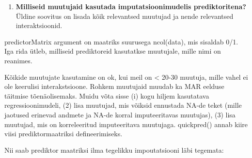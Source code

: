 \documentclass[]{book}
\newenvironment{Shaded}{\begin{snugshade}}{\end{snugshade}}
\newcommand{\KeywordTok}[1]{\textcolor[rgb]{0.13,0.29,0.53}{\textbf{#1}}}
\newcommand{\DataTypeTok}[1]{\textcolor[rgb]{0.13,0.29,0.53}{#1}}
\newcommand{\DecValTok}[1]{\textcolor[rgb]{0.00,0.00,0.81}{#1}}
\newcommand{\StringTok}[1]{\textcolor[rgb]{0.31,0.60,0.02}{#1}}
\newcommand{\CommentTok}[1]{\textcolor[rgb]{0.56,0.35,0.01}{\textit{#1}}}
\newcommand{\OtherTok}[1]{\textcolor[rgb]{0.56,0.35,0.01}{#1}}
\newcommand{\OperatorTok}[1]{\textcolor[rgb]{0.81,0.36,0.00}{\textbf{#1}}}
\newcommand{\NormalTok}[1]{#1}
\providecommand{\tightlist}{%
  \setlength{\itemsep}{0pt}\setlength{\parskip}{0pt}}
\begin{document}
\begin{enumerate}
\def\labelenumi{\arabic{enumi}.}
\setcounter{enumi}{2}
\tightlist
\item
  \textbf{Milliseid muutujaid kasutada imputatsioonimudelis
  prediktoritena?} Üldine soovitus on lisada kõik relevantsed muutujad
  ja nende relevantsed interaktsioonid.
\end{enumerate}

predictorMatrix argument on maatriks suurusega ncol(data), mis sisaldab
0/1. Iga rida ütleb, milliseid prediktoreid kasutatkse muutujale, mille
nimi on reanimes.

\begin{Shaded}
\end{Shaded}

Kõikide muutujate kasutamine on ok, kui meil on \textless{} 20-30
muutuja, mille vahel ei ole keerulisi interakstsioone. Rohkem muutujaid
muudab ka MAR eelduse täitmise tõenäolisemaks. Muidu võta sisse (i) kogu
hiljem kasutatava regressioonimudeli, (2) lisa muutujad, mis võiksid
ennustada NA-de teket (mille jaotused erinevad andmete ja NA-de korral
imputeeritavas muutujas), (3) lisa muutujad, mis on korreleeritud
imputeeritava muutujaga. quickpred() annab kiire viisi
prediktormaatriksi defineerimiseks.

Nii saab prediktor maatriksi ilma tegelikku impoutatsiooni läbi
tegemata:

\begin{Shaded}
\end{Shaded}
\end{document}

